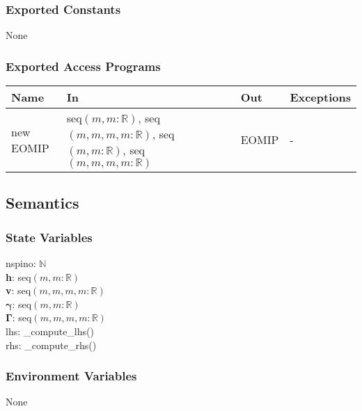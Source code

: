 \documentclass[12pt, titlepage]{article}
\begin{document}
\subsubsection{Exported Constants}
None

\subsubsection{Exported Access Programs}

\begin{center}
	\begin{tabular}{p{2.3cm} p{4cm} p{4cm} p{2cm}}
		\hline
		\textbf{Name} & \textbf{In} & \textbf{Out} & \textbf{Exceptions} \\
		\hline
		new EOMIP & seq$(m,m:\mathbb{R})$, seq$(m,m,m,m:\mathbb{R})$, 
		seq$(m,m:\mathbb{R})$, seq$(m,m,m,m:\mathbb{R})$& EOMIP & - \\
		\hline
	\end{tabular}
\end{center}

\subsection{Semantics}

\subsubsection{State Variables}
nspino: $\mathbb{N}$\\
\textbf{h}: seq$(m,m:\mathbb{R})$\\
\textbf{v}: seq$(m,m,m,m:\mathbb{R})$\\
$\boldsymbol{\gamma}$: seq$(m,m:\mathbb{R})$\\
$\boldsymbol{\Gamma}$: seq$(m,m,m,m:\mathbb{R})$\\
lhs: \_compute\_lhs()\\
rhs: \_compute\_rhs()

\subsubsection{Environment Variables}

None
\end{document}
